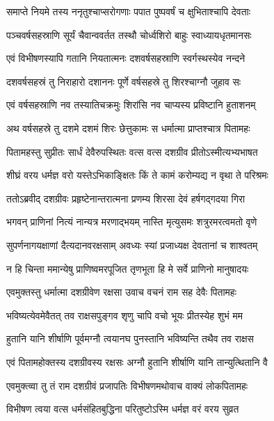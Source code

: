 \twolineshloka
{समाप्ते नियमे तस्य ननृतुश्चाप्सरोगणाः}
{पपात पुष्पवर्षं च क्षुभिताश्चापि देवताः} %

\twolineshloka
{पञ्चवर्षसहस्राणि सूर्यं चैवान्ववर्तत}
{तस्थौ चोर्ध्वशिरो बाहुः स्वाध्यायधृतमानसः} %

\twolineshloka
{एवं विभीषणस्यापि गतानि नियतात्मनः}
{दशवर्षसहस्राणि स्वर्गस्थस्येव नन्दने} %

\twolineshloka
{दशवर्षसहस्रं तु निराहारो दशाननः}
{पूर्णे वर्षसहस्रे तु शिरश्चाग्नौ जुहाव सः} %

\twolineshloka
{एवं वर्षसहस्राणि नव तस्यातिचक्रमुः}
{शिरांसि नव चाप्यस्य प्रविष्टानि हुताशनम्} %

\twolineshloka
{अथ वर्षसहस्रे तु दशमे दशमं शिरः}
{छेत्तुकामः स धर्मात्मा प्राप्तश्चात्र पितामहः} %

\twolineshloka
{पितामहस्तु सुप्रीतः सार्धं देवैरुपस्थितः}
{वत्स वत्स दशग्रीव प्रीतोऽस्मीत्यभ्यभाषत} %

\twolineshloka
{शीघ्रं वरय धर्मज्ञ वरो यस्तेऽभिकाङ्क्षितः}
{किं ते कामं करोम्यद्य न वृथा ते परिश्रमः} %

\twolineshloka
{ततोऽब्रवीद् दशग्रीवः प्रहृष्टेनान्तरात्मना}
{प्रणम्य शिरसा देवं हर्षगद्गदया गिरा} %

\twolineshloka
{भगवन् प्राणिनां नित्यं नान्यत्र मरणाद्भयम्}
{नास्ति मृत्युसमः शत्रुरमरत्वमतो वृणे} %

\twolineshloka
{सुपर्णनागयक्षाणां दैत्यदानवरक्षसाम्}
{अवध्यः स्यां प्रजाध्यक्ष देवतानां च शाश्वतम्} %

\twolineshloka
{न हि चिन्ता ममान्येषु प्राणिष्वमरपूजित}
{तृणभूता हि मे सर्वे प्राणिनो मानुषादयः} %

\twolineshloka
{एवमुक्तस्तु धर्मात्मा दशग्रीवेण रक्षसा}
{उवाच वचनं राम सह देवैः पितामहः} %

\twolineshloka
{भविष्यत्येवमेवैतत् तव राक्षसपुङ्गव}
{शृणु चापि वचो भूयः प्रीतस्येह शुभं मम} %

\twolineshloka
{हुतानि यानि शीर्षाणि पूर्वमग्नौ त्वयानघ}
{पुनस्तानि भविष्यन्ति तथैव तव राक्षस} %

\twolineshloka
{एवं पितामहोक्तस्य दशग्रीवस्य रक्षसः}
{अग्नौ हुतानि शीर्षाणि यानि तान्युत्थितानि वै} %

\twolineshloka
{एवमुक्त्व्वा तु तं राम दशग्रीवं प्रजापतिः}
{विभीषणमथोवाच वाक्यं लोकपितामहः} %

\twolineshloka
{विभीषण त्वया वत्स धर्मसंहितबुद्धिना}
{परितुष्टोऽस्मि धर्मज्ञ वरं वरय सुव्रत} %


